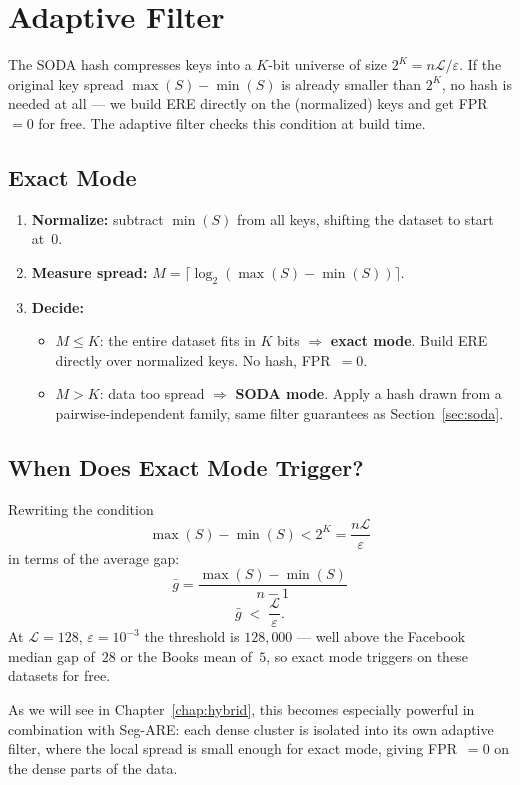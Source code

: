 \section{Adaptive Filter}
\label{sec:adaptive}

The SODA hash compresses keys into a $K$-bit universe of size $2^K = n\mathcal{L}/\varepsilon$.
If the original key spread $\max(S) - \min(S)$ is already smaller than $2^K$,
no hash is needed at all --- we build ERE directly on the (normalized) keys
and get FPR~$= 0$ for free.
The adaptive filter checks this condition at build time.

\subsection{Exact Mode}
\label{subsec:exact-mode}

\begin{enumerate}
    \item \textbf{Normalize:} subtract $\min(S)$ from all keys, shifting the dataset to
    start at~0.
    \item \textbf{Measure spread:} $M = \lceil \log_2(\max(S) - \min(S)) \rceil$.
    \item \textbf{Decide:}
    \begin{itemize}
        \item $M \leq K$: the entire dataset fits in $K$ bits $\Rightarrow$ \textbf{exact
        mode}. Build ERE directly over normalized keys. No hash, FPR~$= 0$.
        \item $M > K$: data too spread $\Rightarrow$ \textbf{SODA mode}. Apply
        a hash drawn from a pairwise-independent family, same filter guarantees as Section~\ref{sec:soda}.
    \end{itemize}
\end{enumerate}

\subsection{When Does Exact Mode Trigger?}

Rewriting the condition
\[
    \max(S) - \min(S) < 2^{K} = \frac{n\mathcal{L}}{\varepsilon}
\]
in terms of
the average gap:
\[
    \bar{g} = \frac{\max(S) - \min(S)}{n - 1}
\]
\begin{equation}
    \bar{g} \;<\; \frac{\mathcal{L}}{\varepsilon}.
    \label{eq:exact-threshold}
\end{equation}
At $\mathcal{L} = 128$, $\varepsilon = 10^{-3}$ the threshold is $128{,}000$ ---
well above the Facebook median gap of~$28$ or the Books mean of~$5$,
so exact mode triggers on these datasets for free.

As we will see in Chapter~\ref{chap:hybrid}, this becomes especially powerful in combination with Seg-ARE:
each dense cluster is isolated into its own adaptive filter,
where the local spread is small enough for exact mode, giving FPR~$= 0$ on the dense
parts of the data.
